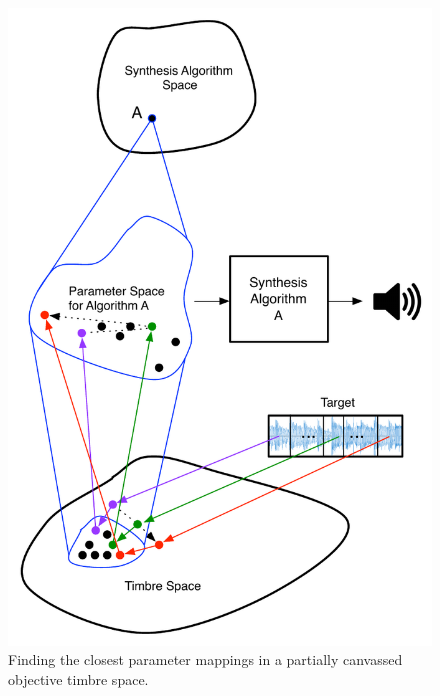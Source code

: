 \documentclass[a4paper,12pt]{report} 	%
\numberwithin{figure}{chapter}
\numberwithin{table}{chapter}
\numberwithin{equation}{chapter}
\begin{document}
\begin{flushleft}
\begin{figure}[h!]
\begin{center}
\includegraphics[scale=0.75]{PucketteMetaSynthesis}
\caption[Mapping Timbre to Parameters]{Finding the closest parameter mappings in a partially canvassed objective timbre space.}
\end{center}
\end{figure}

\end{flushleft}
\end{document}
